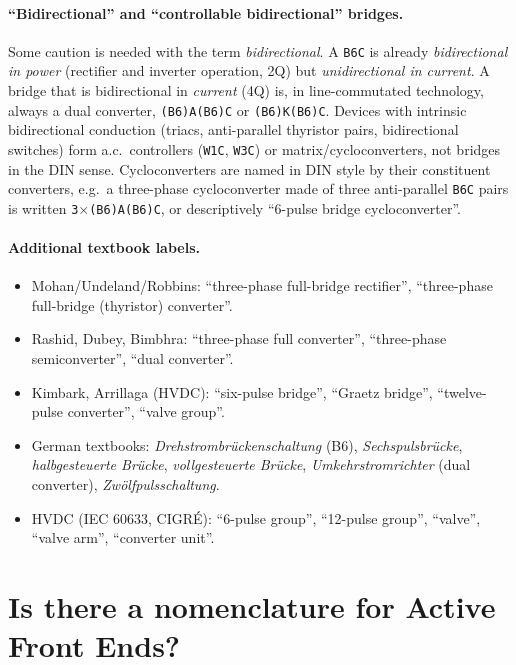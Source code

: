 \documentclass[11pt,a4paper]{article}
\newcommand{\code}[1]{\texttt{#1}}
\begin{document}
\paragraph{``Bidirectional'' and ``controllable bidirectional'' bridges.}
Some caution is needed with the term \emph{bidirectional}. A \code{B6C} is already \emph{bidirectional in power} (rectifier and inverter operation, 2Q) but \emph{unidirectional in current}. A bridge that is bidirectional in \emph{current} (4Q) is, in line-commutated technology, always a dual converter, \code{(B6)A(B6)C} or \code{(B6)K(B6)C}. Devices with intrinsic bidirectional conduction (triacs, anti-parallel thyristor pairs, bidirectional switches) form a.c.\ controllers (\code{W1C}, \code{W3C}) or matrix/cycloconverters, not bridges in the DIN sense. Cycloconverters are named in DIN style by their constituent converters, e.g.\ a three-phase cycloconverter made of three anti-parallel \code{B6C} pairs is written \code{3$\times$(B6)A(B6)C}, or descriptively ``6-pulse bridge cycloconverter''.

\paragraph{Additional textbook labels.}
\begin{itemize}
\item Mohan/Undeland/Robbins: ``three-phase full-bridge rectifier'', ``three-phase full-bridge (thyristor) converter''.
\item Rashid, Dubey, Bimbhra: ``three-phase full converter'', ``three-phase semiconverter'', ``dual converter''.
\item Kimbark, Arrillaga (HVDC): ``six-pulse bridge'', ``Graetz bridge'', ``twelve-pulse converter'', ``valve group''.
\item German textbooks: \emph{Drehstrombrückenschaltung} (B6), \emph{Sechspulsbrücke}, \emph{halbgesteuerte Brücke}, \emph{vollgesteuerte Brücke}, \emph{Umkehrstromrichter} (dual converter), \emph{Zwölfpulsschaltung}.
\item HVDC (IEC 60633, CIGRÉ): ``6-pulse group'', ``12-pulse group'', ``valve'', ``valve arm'', ``converter unit''.
\end{itemize}

\section{Is there a nomenclature for Active Front Ends?}
\label{sec:afe}
\end{document}
